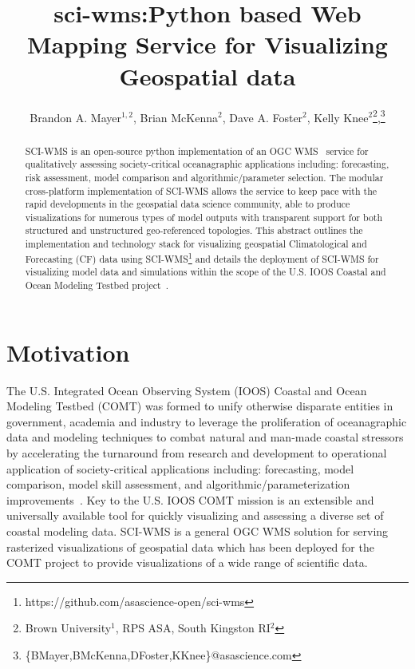 \documentclass[11pt,twocolumn,twoside]{IEEEtran}
\newcommand{\comt}{COMT}
\newcommand{\ioos}{IOOS}
\newcommand{\ogc}{OGC}
\newcommand{\wms}{WMS}
\newcommand{\sciwms}{SCI-WMS}
\begin{document}
\title{\vspace{0.2in}\sc sci-wms:Python based Web Mapping Service for Visualizing Geospatial data}


\author{Brandon A. Mayer$^{1,2}$, Brian McKenna$^{2}$, Dave A. Foster$^{2}$, Kelly Knee$^{2}$\thanks{Brown University$^{1}$, RPS ASA, South Kingston RI$^{2}$},\thanks{\{BMayer,BMcKenna,DFoster,KKnee\}@asascience.com}}

\maketitle
\thispagestyle{fancy}

\begin{abstract}
\sciwms{} is an open-source python implementation of an \ogc{}
\wms{}~\cite{wms14} service for qualitatively assessing
society-critical oceanagraphic applications including: forecasting,
risk assessment, model comparison and algorithmic/parameter
selection. The modular cross-platform implementation of \sciwms{}
allows the service to keep pace with the rapid developments in the
geospatial data science community, able to produce visualizations for
numerous types of model outputs with transparent support for both
structured and unstructured geo-referenced topologies. This abstract
outlines the implementation and technology stack for visualizing
geospatial Climatological and Forecasting (CF) data using
\sciwms{}\footnote{https://github.com/asascience-open/sci-wms} and
details the deployment of \sciwms{} for visualizing model data and
simulations within the scope of the U.S. \ioos{} Coastal and Ocean
Modeling Testbed project~\cite{luettich13}.
\end{abstract}

\section{Motivation}
The U.S. Integrated Ocean Observing System (\ioos{}) Coastal and Ocean
Modeling Testbed (\comt{}) was formed to unify otherwise disparate
entities in government, academia and industry to leverage the
proliferation of oceanagraphic data and modeling techniques to combat
natural and man-made coastal stressors by accelerating the turnaround
from research and development to operational application of
society-critical applications including: forecasting, model
comparison, model skill assessment, and algorithmic/parameterization
improvements~\cite{luettich13}. Key to the U.S. \ioos{} \comt{}
mission is an extensible and universally available tool for quickly
visualizing and assessing a diverse set of coastal modeling
data. \sciwms{} is a general \ogc{} \wms{} solution for serving
rasterized visualizations of geospatial data which has been deployed
for the \comt{} project to provide visualizations of a wide range of
scientific data.
\end{document}
